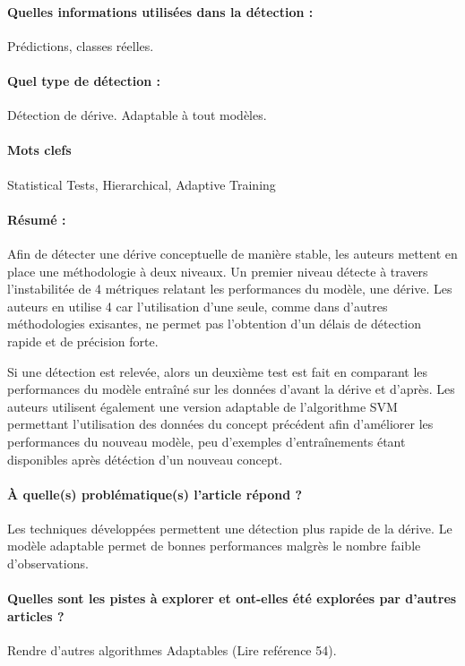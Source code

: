 \documentclass[11pt,a4paper]{report}
\begin{document}
\paragraph{Quelles informations utilisées dans la détection :} Prédictions, classes réelles.
\paragraph{Quel type de détection :} Détection de dérive. Adaptable à tout modèles.

\paragraph{Mots clefs} Statistical Tests, Hierarchical, Adaptive Training

\paragraph{Résumé :} Afin de détecter une dérive conceptuelle de manière stable, les auteurs mettent en place une méthodologie à deux niveaux. Un premier niveau détecte à travers l'instabilitée de 4 métriques relatant les performances du modèle, une dérive. Les auteurs en utilise 4 car l'utilisation d'une seule, comme dans d'autres méthodologies exisantes, ne permet pas l'obtention d'un délais de détection rapide et de précision forte.

Si une détection est relevée, alors un deuxième test est fait en comparant les performances du modèle entraîné sur les données d'avant la dérive et d'après. Les auteurs utilisent également une version adaptable de l'algorithme SVM permettant l'utilisation des données du concept précédent afin d'améliorer les performances du nouveau modèle, peu d'exemples d'entraînements étant disponibles après détéction d'un nouveau concept.

\paragraph{À quelle(s) problématique(s) l'article répond ?} Les techniques développées permettent une détection plus rapide de la dérive. Le modèle adaptable permet de bonnes performances malgrès le nombre faible d'observations.

\paragraph{Quelles sont les pistes à explorer et ont-elles  été explorées par d'autres articles ?} Rendre d'autres algorithmes Adaptables (Lire  reférence 54).
\end{document}
